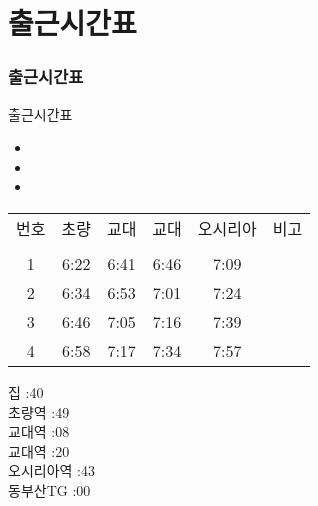\documentclass[aspectratio=1610,20pt,xcolor=pdftex,dvipsnames,table,handout]{beamer}
\begin{document}
		\begin{frame} [t,plain]
		\end{frame}						


		\section{출근시간표}
		\begin{frame} [t,plain]
		\frametitle{출근시간표}
			\begin{block} {출근시간표}
			\setlength{\leftmargini}{2em}			
			\begin{itemize}
				\item 
				\item 
				\item 
			\end{itemize}
			\end{block}				

		   \begin{center}
			\label{table:second}
			\setlength{\tabcolsep}{2pt}
			\small
		     	\begin{tabular}{ c |c|c|c|c|c} \hline
				번호  	& 초량		& 교대  		&교대		& 오시리아 		&비고	\\ 
					  	& 			&			& 		  	&  				&			\\ \hline \hline
																						
				1		& 	6:22		&	6:41		&	6:46		&	7:09		&  \\ \hline
				2		& 	6:34		&	6:53		&	7:01		&	7:24		&  \\ \hline
				3		& 	6:46		&	7:05		&	7:16		&	7:39		&  \\ \hline
				4		& 	6:58		&	7:17		&	7:34		&	7:57		&  \\ \hline

			\end{tabular}
			\end{center}%

				집  			:40  \\
				초량역 		:49  \\
				교대역		:08  \\
				교대역 		:20  \\
				오시리아역 	:43  \\
				동부산TG	:00  \\

		
		\end{frame}						
\end{document}
